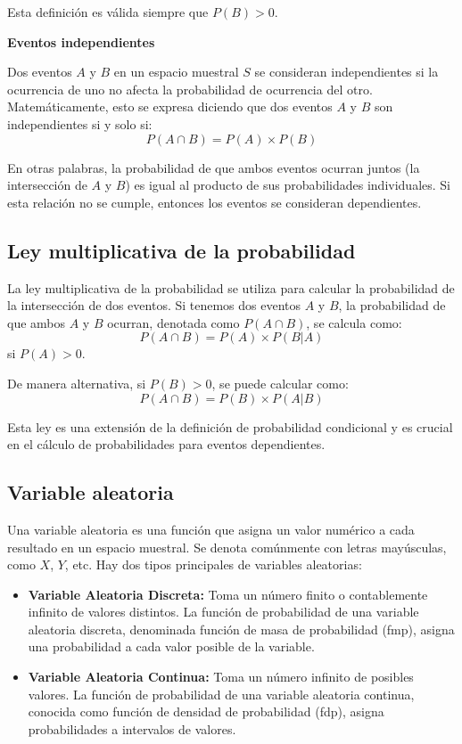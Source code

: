 \documentclass{article}
\begin{document}
Esta definición es válida siempre que \( P(B) > 0 \).

\textbf{Eventos independientes}

Dos eventos \( A \) y \( B \) en un espacio muestral \( S \) se consideran independientes si la ocurrencia de uno no afecta la probabilidad de ocurrencia del otro. Matemáticamente, esto se expresa diciendo que dos eventos \( A \) y \( B \) son independientes si y solo si:
\[ P(A \cap B) = P(A) \times P(B) \]

En otras palabras, la probabilidad de que ambos eventos ocurran juntos (la intersección de \( A \) y \( B \)) es igual al producto de sus probabilidades individuales. Si esta relación no se cumple, entonces los eventos se consideran dependientes.

\subsection{Ley multiplicativa de la probabilidad}

La ley multiplicativa de la probabilidad se utiliza para calcular la probabilidad de la intersección de dos eventos. Si tenemos dos eventos \( A \) y \( B \), la probabilidad de que ambos \( A \) y \( B \) ocurran, denotada como \( P(A \cap B) \), se calcula como:
\[ P(A \cap B) = P(A) \times P(B|A) \]
si \( P(A) > 0 \).

De manera alternativa, si \( P(B) > 0 \), se puede calcular como:
\[ P(A \cap B) = P(B) \times P(A|B) \]

Esta ley es una extensión de la definición de probabilidad condicional y es crucial en el cálculo de probabilidades para eventos dependientes.

\subsection{Variable aleatoria}


Una variable aleatoria es una función que asigna un valor numérico a cada resultado en un espacio muestral. Se denota comúnmente con letras mayúsculas, como \( X \), \( Y \), etc. Hay dos tipos principales de variables aleatorias:

\begin{itemize}
    \item \textbf{Variable Aleatoria Discreta:} Toma un número finito o contablemente infinito de valores distintos. La función de probabilidad de una variable aleatoria discreta, denominada función de masa de probabilidad (fmp), asigna una probabilidad a cada valor posible de la variable.
    \item \textbf{Variable Aleatoria Continua:} Toma un número infinito de posibles valores. La función de probabilidad de una variable aleatoria continua, conocida como función de densidad de probabilidad (fdp), asigna probabilidades a intervalos de valores.
\end{itemize}
\end{document}
